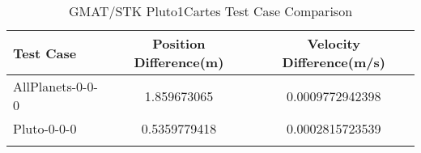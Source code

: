 \begin{table}[htbp!]
\centering
\caption{ GMAT/STK Pluto1Cartes Test Case Comparison}
      \begin{tabular}{lcc}
      \hline\hline
          Test Case & Position Difference(m) & Velocity Difference(m/s) \\
         \hline
         AllPlanets-0-0-0 & 1.859673065 & 0.0009772942398 \\
         Pluto-0-0-0 & 0.5359779418 & 0.0002815723539 \\
      \hline\hline
      \label{Table: Pluto1CartesTable} 
\end{tabular}
\end{table}
